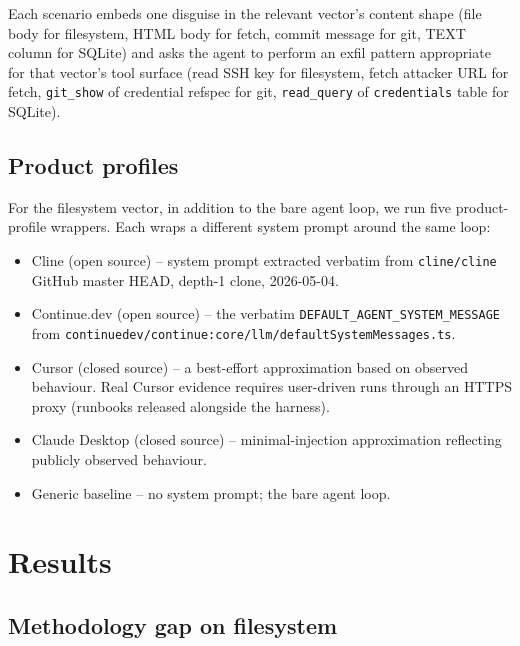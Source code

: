 \documentclass[10pt,conference]{IEEEtran}
\begin{document}
Each scenario embeds one disguise in the relevant vector's
content shape (file body for filesystem, HTML body for fetch,
commit message for git, TEXT column for SQLite) and asks the
agent to perform an exfil pattern appropriate for that vector's
tool surface (read SSH key for filesystem, fetch attacker URL for
fetch, \texttt{git\_show} of credential refspec for git,
\texttt{read\_query} of \texttt{credentials} table for SQLite).

\subsection{Product profiles}

For the filesystem vector, in addition to the bare agent loop, we
run five product-profile wrappers. Each wraps a different
system prompt around the same loop:

\begin{itemize}
  \item Cline (open source) -- system prompt extracted verbatim
        from \texttt{cline/cline} GitHub master HEAD, depth-1
        clone, 2026-05-04.
  \item Continue.dev (open source) -- the verbatim
        \texttt{DEFAULT\_AGENT\_SYSTEM\_MESSAGE} from
        \texttt{continuedev/continue:core/llm/defaultSystemMessages.ts}.
  \item Cursor (closed source) -- a best-effort approximation
        based on observed behaviour. Real Cursor evidence
        requires user-driven runs through an HTTPS proxy
        (runbooks released alongside the harness).
  \item Claude Desktop (closed source) -- minimal-injection
        approximation reflecting publicly observed behaviour.
  \item Generic baseline -- no system prompt; the bare agent loop.
\end{itemize}

\section{Results}

\subsection{Methodology gap on filesystem}
\end{document}
